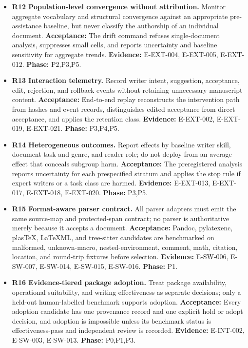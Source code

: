 \documentclass[11pt]{article}
\begin{document}
\begin{itemize}
\item
  \textbf{R12 Population-level convergence without attribution.} Monitor aggregate vocabulary and structural convergence against an appropriate pre-assistance baseline, but never classify the authorship of an individual document. \textbf{Acceptance:} The drift command refuses single-document analysis, suppresses small cells, and reports uncertainty and baseline sensitivity for aggregate trends. \textbf{Evidence:} E-EXT-004, E-EXT-005, E-EXT-012. \textbf{Phase:} P2,P3,P5.
\item
  \textbf{R13 Interaction telemetry.} Record writer intent, suggestion, acceptance, edit, rejection, and rollback events without retaining unnecessary manuscript content. \textbf{Acceptance:} End-to-end replay reconstructs the intervention path from hashes and event records, distinguishes edited acceptance from direct acceptance, and applies the retention class. \textbf{Evidence:} E-EXT-002, E-EXT-019, E-EXT-021. \textbf{Phase:} P3,P4,P5.
\item
  \textbf{R14 Heterogeneous outcomes.} Report effects by baseline writer skill, document task and genre, and reader role; do not deploy from an average effect that conceals subgroup harm. \textbf{Acceptance:} The preregistered analysis reports uncertainty for each prespecified stratum and applies the stop rule if expert writers or a task class are harmed. \textbf{Evidence:} E-EXT-013, E-EXT-017, E-EXT-018, E-EXT-020. \textbf{Phase:} P3,P5.
\item
  \textbf{R15 Format-aware parser contract.} All parser adapters must emit the same source-map and protected-span contract; no parser is authoritative merely because it accepts a document. \textbf{Acceptance:} Pandoc, pylatexenc, plasTeX, LaTeXML, and tree-sitter candidates are benchmarked on malformed, unknown-macro, nested-environment, comment, math, citation, location, and round-trip fixtures before selection. \textbf{Evidence:} E-SW-006, E-SW-007, E-SW-014, E-SW-015, E-SW-016. \textbf{Phase:} P1.
\item
  \textbf{R16 Evidence-tiered package adoption.} Treat package availability, operational suitability, and writing effectiveness as separate decisions; only a held-out human-labelled benchmark supports adoption. \textbf{Acceptance:} Every adoption candidate has one provenance record and one explicit hold or adopt decision, and adoption is impossible unless its benchmark status is effectiveness-pass and independent review is recorded. \textbf{Evidence:} E-INT-002, E-SW-003, E-SW-013. \textbf{Phase:} P0,P1,P3.
\end{itemize}
\end{document}
